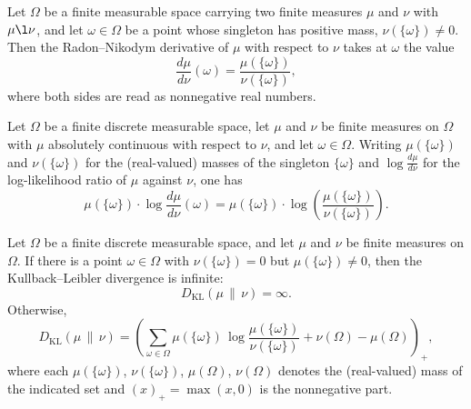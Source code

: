 \begin{theorem}
\label{CommunicationComplexity.rnDeriv_toReal_eq_singleton_ratio}
\leanok
{}
Let $\Omega$ be a finite measurable space carrying two finite measures $\mu$ and $\nu$
with $\mu \l \nu$, and let $\omega \in \Omega$ be a point whose singleton has positive
mass, $\nu(\{\omega\}) \neq 0$. Then the Radon–Nikodym derivative of $\mu$ with respect
to $\nu$ takes at $\omega$ the value
\[
  \frac{d\mu}{d\nu}(\omega) = \frac{\mu(\{\omega\})}{\nu(\{\omega\})},
\]
where both sides are read as nonnegative real numbers.
\end{theorem}

\begin{theorem}
\label{CommunicationComplexity.singleton_mass_mul_llr_eq_log_ratio}
\leanok
{}
Let $\Omega$ be a finite discrete measurable space, let $\mu$ and $\nu$ be finite
measures on $\Omega$ with $\mu$ absolutely continuous with respect to $\nu$, and let
$\omega \in \Omega$. Writing $\mu(\{\omega\})$ and $\nu(\{\omega\})$ for the
(real-valued) masses of the singleton $\{\omega\}$ and $\log\frac{d\mu}{d\nu}$ for the
log-likelihood ratio of $\mu$ against $\nu$, one has
\[
  \mu(\{\omega\}) \cdot \log\frac{d\mu}{d\nu}(\omega)
  = \mu(\{\omega\}) \cdot \log\!\left(\frac{\mu(\{\omega\})}{\nu(\{\omega\})}\right).
\]
\end{theorem}

\begin{theorem}
\label{CommunicationComplexity.FiniteMeasureSpace.klDiv_eq_sum_log}
\leanok
{}
Let $\Omega$ be a finite discrete measurable space, and let $\mu$ and $\nu$ be finite
measures on $\Omega$. If there is a point $\omega \in \Omega$ with $\nu(\{\omega\}) = 0$
but $\mu(\{\omega\}) \neq 0$, then the Kullback–Leibler divergence is infinite:
\[
  D_{\mathrm{KL}}(\mu \,\|\, \nu) = \infty.
\]
Otherwise,
\[
  D_{\mathrm{KL}}(\mu \,\|\, \nu)
  = \left(
      \sum_{\omega \in \Omega}
        \mu(\{\omega\}) \,\log\!\frac{\mu(\{\omega\})}{\nu(\{\omega\})}
      + \nu(\Omega) - \mu(\Omega)
    \right)_{+},
\]
where each $\mu(\{\omega\})$, $\nu(\{\omega\})$, $\mu(\Omega)$, $\nu(\Omega)$ denotes
the (real-valued) mass of the indicated set and $(x)_{+} = \max(x, 0)$ is the
nonnegative part.
\end{theorem}

